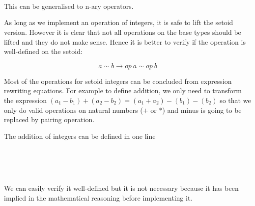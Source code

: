\begin{code}
\\
\> \AgdaSymbol{:} \AgdaSymbol{(} \AgdaSymbol{:}   \AgdaSymbol{)}    \<%
\\
\>  \AgdaSymbol{=} \AgdaFunction{[\_]}    \<%
\\
\end{code}

This can be generalised to n-ary operators.

As long as we implement an operation of integers, it is safe to lift
the setoid version. However it is clear that not all operations on the
base types should be lifted and they do not make sense. Hence it is
better to verify if the operation is well-defined on the setoid:

$$a \sim b → op~a \sim op~b$$



Most of the operations for setoid integers can be concluded from
expression rewriting equations. For example to define addition, 
we only need to transform the expression  
$(a_1 - b_1) + (a_2 - b_2) = (a_1 + a_2) - (b_1) - (b_2)$
so that we only do valid
operations on natural numbers ($+$ or $*$) and minus is going to be
replaced by pairing operation.

The addition of integers can be defined in one line

\begin{code}
\\
\>\AgdaFunction{\_+\_} \AgdaSymbol{:}     \<%
\\
\>\AgdaSymbol{(} \AgdaInductiveConstructor{,} \AgdaSymbol{)} \AgdaFunction{+} \AgdaSymbol{(} \AgdaInductiveConstructor{,} \AgdaSymbol{)} \AgdaSymbol{=} \AgdaSymbol{(}  \AgdaSymbol{)} \AgdaInductiveConstructor{,} \AgdaSymbol{(}  \AgdaSymbol{)}\<%
\\
\end{code}

We can easily verify it well-defined but it is not necessary because
it has been implied in the mathematical reasoning before implementing it.



